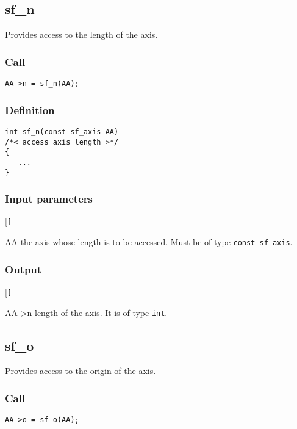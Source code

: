 \subsection{{sf\_n}}\label{sec:sf_n}
Provides access to the length of the axis.

\subsubsection*{Call}
\begin{verbatim}AA->n = sf_n(AA);\end{verbatim}

\subsubsection*{Definition}
\begin{verbatim}  
int sf_n(const sf_axis AA) 
/*< access axis length >*/
{
   ...
}
\end{verbatim}

\subsubsection{Input parameters}
\begin{desclist}{\tt }{\quad}[\tt ]
   \setlength\itemsep{0pt}
   \item[AA] the axis whose length is to be accessed. Must be of type \texttt{const sf\_axis}.  
\end{desclist}

\subsubsection*{Output}
\begin{desclist}{\tt }{\quad}[\tt ]
   \setlength\itemsep{0pt}  
   \item[AA->n] length of the axis. It is of type \texttt{int}.
\end{desclist}




\subsection{{sf\_o}}
Provides access to the origin of the axis.

\subsubsection*{Call}
\begin{verbatim}AA->o = sf_o(AA);\end{verbatim}

